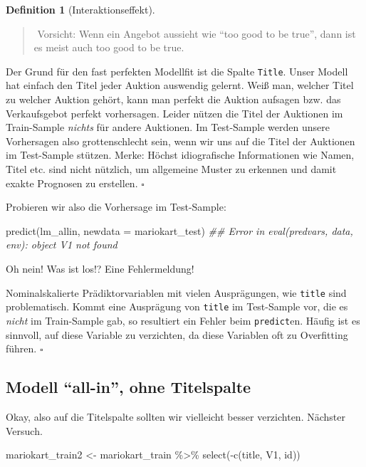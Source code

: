 \documentclass[
  letterpaper,
]{scrbook}
\newenvironment{Shaded}{\begin{snugshade}}{\end{snugshade}}
\newcommand{\AttributeTok}[1]{\textcolor[rgb]{0.40,0.45,0.13}{#1}}
\newcommand{\DocumentationTok}[1]{\textcolor[rgb]{0.37,0.37,0.37}{\textit{#1}}}
\newcommand{\FunctionTok}[1]{\textcolor[rgb]{0.28,0.35,0.67}{#1}}
\newcommand{\NormalTok}[1]{\textcolor[rgb]{0.00,0.23,0.31}{#1}}
\newcommand{\OtherTok}[1]{\textcolor[rgb]{0.00,0.23,0.31}{#1}}
\newcommand{\SpecialCharTok}[1]{\textcolor[rgb]{0.37,0.37,0.37}{#1}}
\theoremstyle{definition}
\theoremstyle{definition}
\theoremstyle{definition}
\newtheorem{definition}{Definition}[chapter]
\theoremstyle{remark}
\begin{document}
\begin{definition}[Interaktionseffekt]
\begin{quote}
{}️ Vorsicht: Wenn ein Angebot aussieht wie
\enquote{too good to be true}, dann ist es meist auch too good to be
true.
\end{quote}

Der Grund für den fast perfekten Modellfit ist die Spalte
\texttt{Title}. Unser Modell hat einfach den Titel jeder Auktion
auswendig gelernt. Weiß man, welcher Titel zu welcher Auktion gehört,
kann man perfekt die Auktion aufsagen bzw. das Verkaufsgebot perfekt
vorhersagen. Leider nützen die Titel der Auktionen im Train-Sample
\emph{nichts} für andere Auktionen. Im Test-Sample werden unsere
Vorhersagen also grottenschlecht sein, wenn wir uns auf die Titel der
Auktionen im Test-Sample stützen. Merke: Höchst idiografische
Informationen wie Namen, Titel etc. sind nicht nützlich, um allgemeine
Muster zu erkennen und damit exakte Prognosen zu erstellen. \(\square\)

Probieren wir also die Vorhersage im Test-Sample:

\begin{Shaded}
\begin{Highlighting}[]
\FunctionTok{predict}\NormalTok{(lm\_allin, }\AttributeTok{newdata =}\NormalTok{ mariokart\_test)}
\DocumentationTok{\#\# Error in eval(predvars, data, env): object \textquotesingle{}V1\textquotesingle{} not found}
\end{Highlighting}
\end{Shaded}

Oh nein! Was ist los!? Eine Fehlermeldung!

Nominalskalierte Prädiktorvariablen mit vielen Ausprägungen, wie
\texttt{title} sind problematisch. Kommt eine Ausprägung von
\texttt{title} im Test-Sample vor, die es \emph{nicht} im Train-Sample
gab, so resultiert ein Fehler beim \texttt{predict}en. Häufig ist es
sinnvoll, auf diese Variable zu verzichten, da diese Variablen oft zu
Overfitting führen. \(\square\)

\subsection{\texorpdfstring{Modell \enquote{all-in}, ohne
Titelspalte}{Modell ``all-in'', ohne Titelspalte}}\label{modell-all-in-ohne-titelspalte}

Okay, also auf die Titelspalte sollten wir vielleicht besser verzichten.
Nächster Versuch.

\begin{Shaded}
\begin{Highlighting}[]
\NormalTok{mariokart\_train2 }\OtherTok{\textless{}{-}}
\NormalTok{  mariokart\_train }\SpecialCharTok{\%\textgreater{}\%} 
  \FunctionTok{select}\NormalTok{(}\SpecialCharTok{{-}}\FunctionTok{c}\NormalTok{(title, V1, id))}
\end{Highlighting}
\end{Shaded}


\end{definition}
\end{document}
